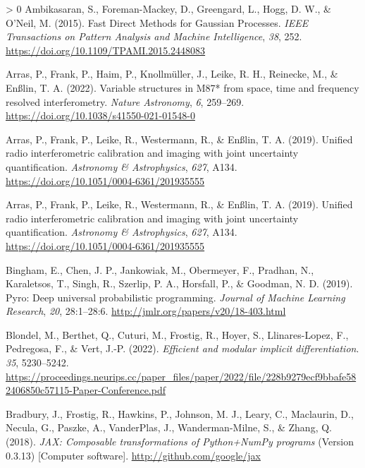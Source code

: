 \documentclass[10pt,a4paper,onecolumn]{article}
\newlength{\cslhangindent}
\newenvironment{CSLReferences}[3] %
 {%
  \setlength{\parindent}{0pt}
  \ifodd #1 \everypar{\setlength{\hangindent}{\cslhangindent}}\ignorespaces\fi
  \ifnum #2 > 0
  \setlength{\parskip}{#2\baselineskip}
  \fi
 }%
 {}
\begin{document}
\hypertarget{refs}{}
\begin{CSLReferences}{1}{0}
\leavevmode\hypertarget{ref-Sivaram2015}{}%
Ambikasaran, S., Foreman-Mackey, D., Greengard, L., Hogg, D. W., \&
O'Neil, M. (2015). {Fast Direct Methods for Gaussian Processes}.
\emph{IEEE Transactions on Pattern Analysis and Machine Intelligence},
\emph{38}, 252. \url{https://doi.org/10.1109/TPAMI.2015.2448083}

\leavevmode\hypertarget{ref-Arras2022}{}%
Arras, P., Frank, P., Haim, P., Knollmüller, J., Leike, R. H., Reinecke,
M., \& Enßlin, T. A. (2022). {Variable structures in M87* from space,
time and frequency resolved interferometry}. \emph{Nature Astronomy},
\emph{6}, 259--269. \url{https://doi.org/10.1038/s41550-021-01548-0}

\leavevmode\hypertarget{ref-Arras2019}{}%
Arras, P., Frank, P., Leike, R., Westermann, R., \& Enßlin, T. A.
(2019). {Unified radio interferometric calibration and imaging with
joint uncertainty quantification}. \emph{Astronomy \& Astrophysics},
\emph{627}, A134. \url{https://doi.org/10.1051/0004-6361/201935555}

\leavevmode\hypertarget{ref-Arras2019}{}%
Arras, P., Frank, P., Leike, R., Westermann, R., \& Enßlin, T. A.
(2019). {Unified radio interferometric calibration and imaging with
joint uncertainty quantification}. \emph{Astronomy \& Astrophysics},
\emph{627}, A134. \url{https://doi.org/10.1051/0004-6361/201935555}

\leavevmode\hypertarget{ref-Bingham2019}{}%
Bingham, E., Chen, J. P., Jankowiak, M., Obermeyer, F., Pradhan, N.,
Karaletsos, T., Singh, R., Szerlip, P. A., Horsfall, P., \& Goodman, N.
D. (2019). Pyro: Deep universal probabilistic programming. \emph{Journal
of Machine Learning Research}, \emph{20}, 28:1--28:6.
\url{http://jmlr.org/papers/v20/18-403.html}

\leavevmode\hypertarget{ref-Blondel2021}{}%
Blondel, M., Berthet, Q., Cuturi, M., Frostig, R., Hoyer, S.,
Llinares-Lopez, F., Pedregosa, F., \& Vert, J.-P. (2022).
\emph{Efficient and modular implicit differentiation}. \emph{35},
5230--5242.
\url{https://proceedings.neurips.cc/paper_files/paper/2022/file/228b9279ecf9bbafe582406850c57115-Paper-Conference.pdf}

\leavevmode\hypertarget{ref-Jax2018}{}%
Bradbury, J., Frostig, R., Hawkins, P., Johnson, M. J., Leary, C.,
Maclaurin, D., Necula, G., Paszke, A., VanderPlas, J., Wanderman-Milne,
S., \& Zhang, Q. (2018). \emph{{JAX}: Composable transformations of
{P}ython+{N}um{P}y programs} (Version 0.3.13) {[}Computer software{]}.
\url{http://github.com/google/jax}


\end{CSLReferences}
\end{document}
